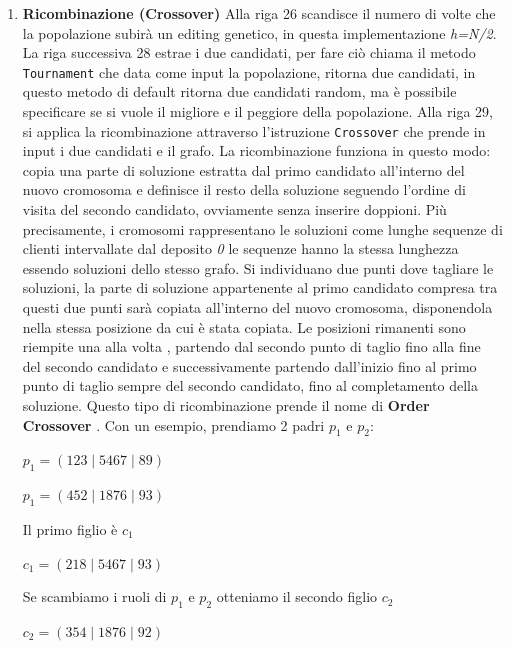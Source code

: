 \documentclass[]{article}
\begin{document}
\begin{enumerate}
\item \textbf{Ricombinazione (Crossover)}
Alla riga 26 scandisce il numero di volte che la popolazione subirà un editing genetico, in questa implementazione \emph{h=N/2}. La riga successiva 28 estrae i due candidati, per fare ciò chiama il metodo \texttt{Tournament} che data come input la popolazione, ritorna due candidati, in questo metodo di default ritorna due candidati random, ma è possibile specificare se si vuole il migliore e il peggiore della popolazione. Alla riga 29, si applica la ricombinazione attraverso l'istruzione \texttt{Crossover} che prende in input i due candidati e il grafo.
La ricombinazione funziona in questo modo: copia una parte di soluzione estratta dal primo candidato all'interno del nuovo cromosoma e definisce il resto della soluzione seguendo l'ordine di visita del secondo candidato, ovviamente senza inserire doppioni. Più precisamente, i cromosomi rappresentano le soluzioni come lunghe sequenze di clienti intervallate dal deposito \emph{0} le sequenze hanno la stessa lunghezza essendo soluzioni dello stesso grafo. Si individuano due punti dove tagliare le soluzioni, la parte di soluzione  appartenente al primo candidato compresa tra questi due punti sarà copiata all'interno del nuovo cromosoma, disponendola nella stessa posizione da cui è stata copiata. Le posizioni rimanenti sono riempite una alla volta , partendo dal secondo punto di taglio fino alla fine del secondo candidato e successivamente partendo dall'inizio fino al primo punto di taglio sempre del secondo candidato, fino al completamento della soluzione.
Questo tipo di ricombinazione prende il nome di \textbf{Order Crossover} \cite{OCR}.
Con un esempio, prendiamo 2 padri \emph{$p_1$} e \emph{$p_2$}:

\begin{center}
 \emph{$p_1 = (1 2 3 \mid 5 4 6 7 \mid 8 9 )$}
\end{center}

\begin{center}
	\emph{$p_1 = (4 5 2 \mid 1 8 7 6 \mid 9 3 )$}
\end{center}
Il primo figlio è \emph{$c_1$}  
\begin{center}
	\emph{$c_1 = (2 1 8 \mid 5 4 6 7 \mid 9 3)$}
\end{center}

Se scambiamo i ruoli di \emph{$p_1$} e \emph{$p_2$} otteniamo il  secondo figlio \emph{$c_2$}  
\begin{center}
	\emph{$c_2 = (3 5 4 \mid 1 8 7 6 \mid 9 2)$}
\end{center}


\end{enumerate}
\end{document}
